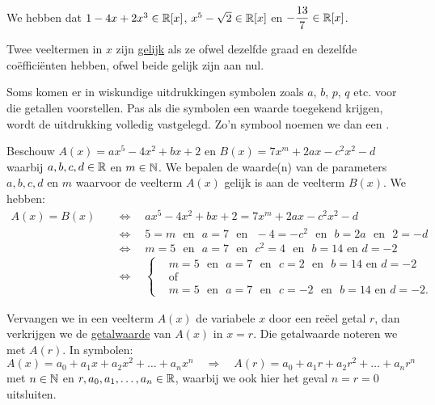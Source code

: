\documentclass{ximera}
\begin{document}
\begin{example} We hebben dat $1-4x+2x^3 \in \mathbb{R}[x]$, $x^5-\sqrt{2} \in \mathbb{R}[x]$ en $\displaystyle -\frac{13}{7} \in \mathbb{R}[x]$.   
\end{example}

Twee veeltermen in $x$ zijn \underline{gelijk} als ze ofwel dezelfde graad en dezelfde co\"effici\"enten hebben, ofwel beide gelijk zijn aan nul. 

Soms komen er in wiskundige uitdrukkingen symbolen zoals $a$, $b$, $p$, $q$ etc. voor die getallen voorstellen. Pas als die symbolen een waarde toegekend krijgen, wordt de uitdrukking volledig vastgelegd. Zo'n symbool noemen we dan een . 

\begin{example}
Beschouw $A(x) = ax^5 - 4x^2 + bx + 2$ en $B(x) = 7x^m + 2ax - c^2x^2 - d$ waarbij $a,b,c,d \in \mathbb{R}$ en $m \in \mathbb{N}$. We bepalen de waarde(n) van de parameters $a,b,c,d$ en $m$ waarvoor de veelterm $A(x)$ gelijk is aan de veelterm $B(x)$. We hebben: 
\begin{align*}
A(x) = B(x) \quad 
& \Leftrightarrow \quad ax^5 - 4x^2 + bx + 2 = 7x^m + 2ax - c^2x^2 - d \\
& \Leftrightarrow \quad 5 = m \,\,\text{ en }\,\, a = 7 \,\,\text{ en }\,\, -4 = -c^2 \,\,\text{ en }\,\, b = 2a \,\,\text{ en }\,\, 2 = -d \\
& \Leftrightarrow \quad m=5 \,\,\text{ en }\,\, a = 7 \,\,\text{ en }\,\, c^2 = 4 \,\,\text{ en }\,\, b = 14 \text{ en } d = -2 \\
& \Leftrightarrow \quad 
\left\{
\begin{aligned}
& m=5 \,\,\text{ en }\,\, a = 7 \,\,\text{ en }\,\, c = 2 \,\,\text{ en }\,\, b = 14 \text{ en } d = -2 \\
& \text{of} \\
& m=5 \,\,\text{ en }\,\, a = 7 \,\,\text{ en }\,\, c = -2 \,\,\text{ en }\,\, b = 14 \text{ en } d = -2.
\end{aligned}
\right.
\end{align*}
\end{example}

Vervangen we in een veelterm $A(x)$ de variabele $x$ door een re\"eel getal $r$, dan verkrijgen we de \underline{getalwaarde} van $A(x)$ in $x = r$. Die getalwaarde noteren we met $A(r)$. In symbolen:
\[
A(x) = a_0 + a_1x + a_2x^2 + \dots + a_n x^n \quad 
\Rightarrow
\quad A(r) = a_0 + a_1 r + a_2r^2 + \dots + a_n r^n
\]
met $n \in \mathbb{N}$ en $r, a_0, a_1, \ldots, a_n \in \mathbb{R}$, waarbij we ook hier het geval $n = r = 0$ uitsluiten. %
\end{document}
